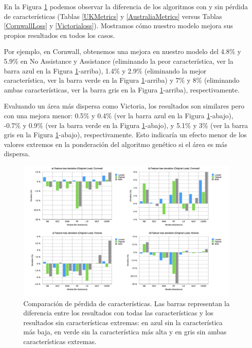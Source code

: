 \documentclass{uathesis-es}
\begin{document}
{	En la Figura \ref{lossFig} podemos observar la diferencia de los algoritmos con y sin pérdida de características (Tablas \ref{UKMetrics} y \ref{AustraliaMetrics} versus Tablas \ref{CornwallLoss} y \ref{Victorialoss}). Mostramos cómo nuestro modelo mejora sus propios resultados en todos los casos.
	
	Por ejemplo, en Cornwall, obtenemos una mejora en nuestro modelo del 4.8\% y 5.9\% en No Assistance y Assistance (eliminando la peor característica, ver la barra azul en la Figura \ref{lossFig}-arriba), 1.4\% y 2.9\% (eliminando la mejor característica, ver la barra verde en la Figura \ref{lossFig}-arriba) y 7\% y 8\% (eliminando ambas características, ver la barra gris en la Figura \ref{lossFig}-arriba), respectivamente.
	
	Evaluando un área más dispersa como Victoria, los resultados son similares pero con una mejora menor: 0.5\% y 0.4\% (ver la barra azul en la Figura \ref{lossFig}-abajo), -0.7\% y 0.9\% (ver la barra verde en la Figura \ref{lossFig}-abajo), y 5.1\% y 3\% (ver la barra gris en la Figura \ref{lossFig}-abajo), respectivamente. Esto indicaría un efecto menor de los valores extremos en la ponderación del algoritmo genético si el área es más dispersa.
	
	\begin{figure}[H]
		\centering
		\includegraphics[width=180mm]{Figures/LossFeatures/loss.png}
		\caption{Comparación de pérdida de características. Las barras representan la diferencia entre los resultados con todas las características y los resultados sin características extremas: en azul sin la característica más baja, en verde sin la característica más alta y en gris sin ambas características extremas.}
		\label{lossFig}
	\end{figure}
	
}
\end{document}
